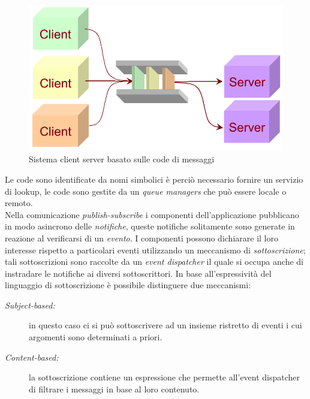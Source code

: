 \begin{figure}
\centering
\includegraphics[width=0.7\linewidth]{img/messagequeue}
\caption{Sistema client server basato sulle code di messaggi}
\label{fig:messagequeue}
\end{figure}
Le code sono identificate da nomi simbolici è perciò necessario fornire un servizio di lookup, le code sono gestite da un \emph{queue managers} che può essere locale o remoto.\\
Nella comunicazione \emph{publish-subscribe} i componenti dell'applicazione pubblicano in modo asincrono delle \emph{notifiche}, queste notifiche solitamente sono generate in reazione al verificarsi di un \emph{evento}. I componenti possono dichiarare il loro interesse rispetto a particolari eventi utilizzando un meccanismo di \emph{sottoscrizione}; tali sottoscrizioni sono raccolte da un \emph{event dispatcher} il quale si occupa anche di instradare le notifiche ai diversi sottoscrittori. In base all'espressività del linguaggio di sottoscrizione è possibile distinguere due meccanismi:
\begin{description}
	\item[\emph{Subject-based:}] in questo caso ci si può sottoscrivere ad un insieme ristretto di eventi i cui argomenti sono determinati a priori.
	\item[\emph{Content-based:}] la sottoscrizione contiene un espressione che permette all'event dispatcher di filtrare i messaggi in base al loro contenuto.
\end{description}
